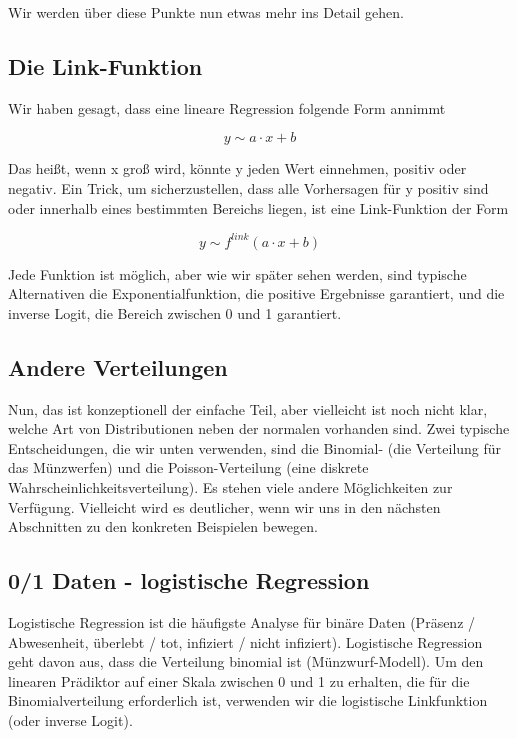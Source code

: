 \documentclass[a4paper,twoside]{tufte-book}\usepackage[]{graphicx}\usepackage[]{color}
\begin{document}
Wir werden über diese Punkte nun etwas mehr ins Detail gehen.

\subsection{Die Link-Funktion}

Wir haben gesagt, dass eine lineare Regression folgende Form annimmt

\begin{equation}
y \sim a \cdot x + b 
\end{equation}

Das heißt, wenn x groß wird, könnte y jeden Wert einnehmen, positiv oder negativ. Ein Trick, um sicherzustellen, dass alle Vorhersagen für y positiv sind oder innerhalb eines bestimmten Bereichs liegen, ist eine Link-Funktion der Form

\begin{equation}
y \sim f^{link}(a \cdot x + b )
\end{equation}

Jede Funktion ist möglich, aber wie wir später sehen werden, sind typische Alternativen die Exponentialfunktion, die positive Ergebnisse garantiert, und die inverse Logit, die Bereich zwischen 0 und 1 garantiert.

\subsection{Andere Verteilungen}

Nun, das ist konzeptionell der einfache Teil, aber vielleicht ist noch nicht klar, welche Art von Distributionen neben der normalen vorhanden sind. Zwei typische Entscheidungen, die wir unten verwenden, sind die Binomial- (die Verteilung für das Münzwerfen) und die Poisson-Verteilung (eine diskrete Wahrscheinlichkeitsverteilung). Es stehen viele andere Möglichkeiten zur Verfügung. Vielleicht wird es deutlicher, wenn wir uns in den nächsten Abschnitten zu den konkreten Beispielen bewegen.

\subsection{0/1 Daten - logistische Regression}

Logistische Regression ist die häufigste Analyse für binäre Daten (Präsenz / Abwesenheit, überlebt / tot, infiziert / nicht infiziert). Logistische Regression geht davon aus, dass die Verteilung binomial ist (Münzwurf-Modell). Um den linearen Prädiktor auf einer Skala zwischen 0 und 1 zu erhalten, die für die Binomialverteilung erforderlich ist, verwenden wir die logistische Linkfunktion (oder inverse Logit).
\end{document}

